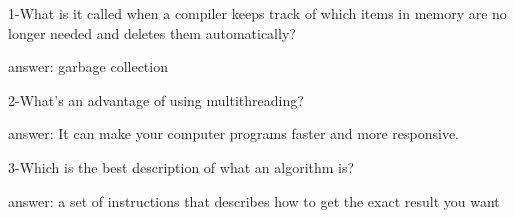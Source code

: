 1-What is it called when a compiler keeps track of which items in memory are no longer needed and deletes them automatically?


answer: garbage collection

2-What's an advantage of using multithreading?


answer: It can make your computer programs faster and more responsive.

3-Which is the best description of what an algorithm is?


answer: a set of instructions that describes how to get the exact result you want
